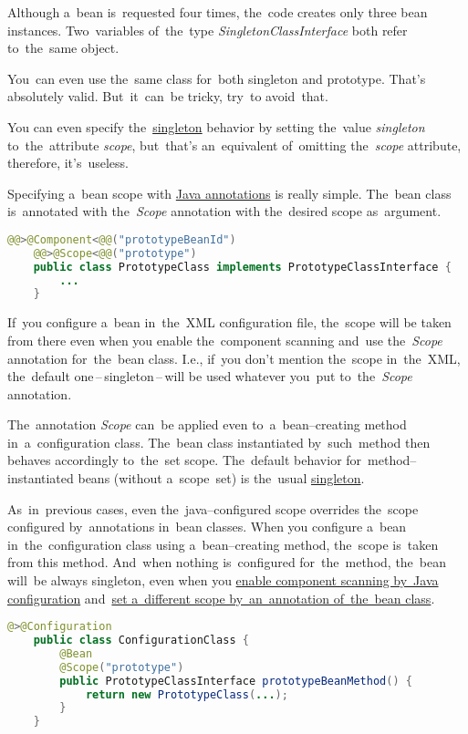 \noindent Although a~bean is~requested four times, the~code creates only three bean instances. Two~variables of~the~type \textit{SingletonClassInterface} both refer to~the~same object.

\note You~can even use the~same class for~both singleton and prototype. That's absolutely valid. But~it~can~be tricky, try~to avoid~that.

\note You can even specify the~\hyperref[singletondp]{singleton} behavior by setting the~value \textit{singleton} to~the~attribute \textit{scope}, but~that's an~equivalent of~omitting the~\textit{scope} attribute, therefore, it's~useless.

\label{bsannotations}
Specifying a~bean scope with \hyperref[javaannotation]{Java annotations} is really simple. The~bean class is~annotated with the~\textit{Scope} annotation with the~desired scope as~argument.

\example
\begin{lstlisting}[language=Java, title={Bean class with the prototype scope set by the annotation}]@@>@Component<@@("prototypeBeanId")
    @@>@Scope<@@("prototype")
    public class PrototypeClass implements PrototypeClassInterface {
        ...
    }
\end{lstlisting}

\warning If~you configure a~bean in~the~XML configuration file, the~scope will be taken from there even when you enable the~component scanning and~use the~\textit{Scope} annotation for~the~bean class. I.e., if~you don't mention the~scope in~the~XML, the~default one\,--\,singleton\,--\,will be used whatever you~put to~the~\textit{Scope} annotation.

The~annotation \textit{Scope} can~be applied even to~a~bean--creating method in~a~configuration class. The~bean class instantiated by~such~method then behaves accordingly to~the~set scope. The~default behavior for~method--instantiated beans (without a~scope~set) is the~usual \hyperref[singletondp]{singleton}.

\warning As~in~previous cases, even the~java--configured scope overrides the~scope configured by~annotations in~bean classes. When you configure a~bean in~the~configuration class using a~bean--creating method, the~scope is~taken from this method. And~when nothing is~configured for~the~method, the~bean will~be always singleton, even when you \hyperref[iocnoxml]{enable component scanning by~Java configuration} and~\hyperref[bsannotations]{set a~different scope by~an~annotation of~the~bean class}.

\example
\begin{lstlisting}[language=Java, title={Configuration class with a prototype bean--creating metod}]@>@Configuration
    public class ConfigurationClass {
        @Bean
        @Scope("prototype")
        public PrototypeClassInterface prototypeBeanMethod() {
            return new PrototypeClass(...);
        }
    }
\end{lstlisting}
\newpage

